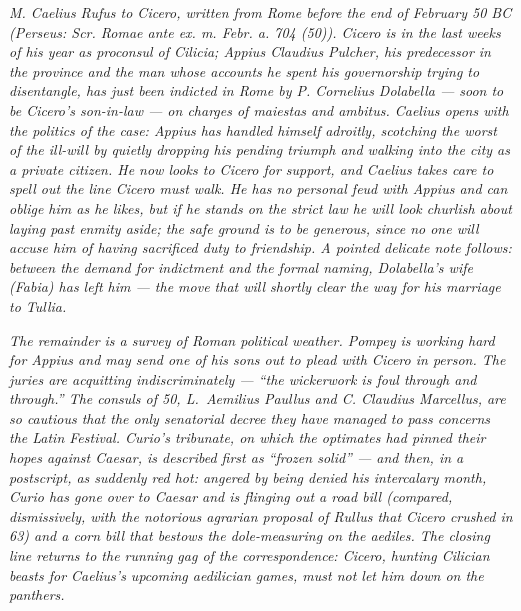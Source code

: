 
\textit{M. Caelius Rufus to Cicero, written from Rome before
the end of February 50 BC (Perseus: \textit{Scr. Romae ante
ex. m. Febr. a. 704 (50)}). Cicero is in the last weeks of his
year as proconsul of Cilicia; Appius Claudius Pulcher, his
predecessor in the province and the man whose accounts he
spent his governorship trying to disentangle, has just been
indicted in Rome by P. Cornelius Dolabella --- soon to be
Cicero's son-in-law --- on charges of maiestas and ambitus.
Caelius opens with the politics of the case: Appius has
handled himself adroitly, scotching the worst of the
ill-will by quietly dropping his pending triumph and walking
into the city as a private citizen. He now looks to Cicero
for support, and Caelius takes care to spell out the line
Cicero must walk. He has no personal feud with Appius and
can oblige him as he likes, but if he stands on the strict
law he will look churlish about laying past enmity aside;
the safe ground is to be generous, since no one will accuse
him of having sacrificed duty to friendship. A pointed
delicate note follows: between the demand for indictment
and the formal naming, Dolabella's wife (Fabia) has left
him --- the move that will shortly clear the way for his
marriage to Tullia.}

\textit{The remainder is a survey of Roman political weather.
Pompey is working hard for Appius and may send one of his
sons out to plead with Cicero in person. The juries are
acquitting indiscriminately --- ``the wickerwork is foul
through and through.'' The consuls of 50, L.~Aemilius
Paullus and C. Claudius Marcellus, are so cautious that the
only senatorial decree they have managed to pass concerns
the Latin Festival. Curio's tribunate, on which the
optimates had pinned their hopes against Caesar, is
described first as ``frozen solid'' --- and then, in a
postscript, as suddenly red hot: angered by being denied his
intercalary month, Curio has gone over to Caesar and is
flinging out a road bill (compared, dismissively, with the
notorious agrarian proposal of Rullus that Cicero crushed in
63) and a corn bill that bestows the dole-measuring on the
aediles. The closing line returns to the running gag of the
correspondence: Cicero, hunting Cilician beasts for Caelius's
upcoming aedilician games, must not let him down on the
panthers.}

